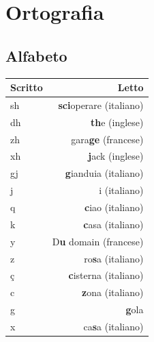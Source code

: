 
\chapter{Ortografia}

\section{Alfabeto}

\begin{minipage}{0.48\textwidth}
    \begin{table}[H]
        \centering
        \begin{tabular}{lr}
            \toprule
            Scritto     &   Letto \\
            \midrule
            sh          &   \textbf{sci}operare (italiano)\\
            dh          &   \textbf{th}e (inglese) \\
            zh          &   gara\textbf{ge} (francese)\\
            xh          &   \textbf{j}ack (inglese) \\
            gj          &   \textbf{g}ianduia (italiano)\\
            j           &   i (italiano)\\
            q           &   \textbf{c}iao (italiano)\\
            k           &   \textbf{c}asa (italiano)\\ 
            y           &   D\textbf{u} domain (francese)\\
            z           &   ro\textbf{s}a (italiano) \\
            ç           &   \textbf{c}isterna (italiano) \\
            c           &   \textbf{z}ona (italiano) \\
            g           &   \textbf{g}ola \\
            x           &   ca\textbf{s}a (italiano) \\
            \bottomrule
        \end{tabular}
    \end{table}
\end{minipage}\quad%

